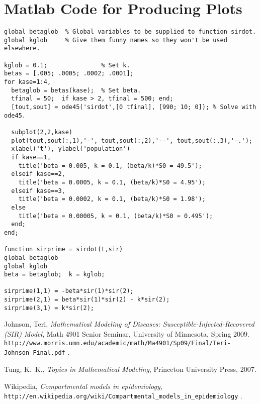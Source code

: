 \documentclass[11pt]{article}
\begin{document}
\newpage
\appendix
\section{Matlab Code for Producing Plots}

\begin{verbatim}
global betaglob  % Global variables to be supplied to function sirdot.
global kglob     % Give them funny names so they won't be used elsewhere.

kglob = 0.1;               % Set k.
betas = [.005; .0005; .0002; .0001];
for kase=1:4,
  betaglob = betas(kase);  % Set beta.
  tfinal = 50;  if kase > 2, tfinal = 500; end;
  [tout,sout] = ode45('sirdot',[0 tfinal], [990; 10; 0]); % Solve with ode45.

  subplot(2,2,kase)  
  plot(tout,sout(:,1),'-', tout,sout(:,2),'--', tout,sout(:,3),'-.');
  xlabel('t'), ylabel('population')
  if kase==1,
    title('beta = 0.005, k = 0.1, (beta/k)*S0 = 49.5');
  elseif kase==2,
    title('beta = 0.0005, k = 0.1, (beta/k)*S0 = 4.95');
  elseif kase==3,
    title('beta = 0.0002, k = 0.1, (beta/k)*S0 = 1.98');
  else
    title('beta = 0.00005, k = 0.1, (beta/k)*S0 = 0.495');
  end;
end;

function sirprime = sirdot(t,sir)
global betaglob
global kglob
beta = betaglob;  k = kglob;

sirprime(1,1) = -beta*sir(1)*sir(2);
sirprime(2,1) = beta*sir(1)*sir(2) - k*sir(2);
sirprime(3,1) = k*sir(2);
\end{verbatim}

\newpage

\begin{thebibliography}{99}

  Johnson, Teri, {\em Mathematical Modeling of Diseases:
Susceptible-Infected-Recovered (SIR) Model}, Math 4901 Senior Seminar, 
University of Minnesota, Spring 2009.
\verb+http://www.morris.umn.edu/academic/math/Ma4901/Sp09/Final/Teri-Johnson-Final.pdf+ .

 Tung, K.~K., {\em Topics in Mathematical Modeling},
Princeton University Press, 2007.

 Wikipedia, {\em Compartmental models in epidemiology},
\verb+http://en.wikipedia.org/wiki/Compartmental_models_in_epidemiology+ .

\end{thebibliography}
\end{document}
